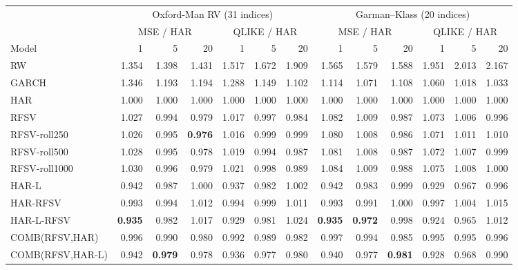 \begin{tabular}{lrrrrrr@{\hskip 14pt}rrrrrr}
\toprule
 & \multicolumn{6}{c}{Oxford-Man RV (31 indices)} & \multicolumn{6}{c}{Garman--Klass (20 indices)}\\
 & \multicolumn{3}{c}{MSE / HAR} & \multicolumn{3}{c}{QLIKE / HAR} & \multicolumn{3}{c}{MSE / HAR} & \multicolumn{3}{c}{QLIKE / HAR}\\
Model & 1 & 5 & 20 & 1 & 5 & 20 & 1 & 5 & 20 & 1 & 5 & 20\\
\midrule
RW & 1.354 & 1.398 & 1.431 & 1.517 & 1.672 & 1.909 & 1.565 & 1.579 & 1.588 & 1.951 & 2.013 & 2.167\\
GARCH & 1.346 & 1.193 & 1.194 & 1.288 & 1.149 & 1.102 & 1.114 & 1.071 & 1.108 & 1.060 & 1.018 & 1.033\\
HAR & 1.000 & 1.000 & 1.000 & 1.000 & 1.000 & 1.000 & 1.000 & 1.000 & 1.000 & 1.000 & 1.000 & 1.000\\
RFSV & 1.027 & 0.994 & 0.979 & 1.017 & 0.997 & 0.984 & 1.082 & 1.009 & 0.987 & 1.073 & 1.006 & 0.996\\
\midrule
RFSV-roll250 & 1.026 & 0.995 & \textbf{0.976} & 1.016 & 0.999 & 0.999 & 1.080 & 1.008 & 0.986 & 1.071 & 1.011 & 1.010\\
RFSV-roll500 & 1.028 & 0.995 & 0.978 & 1.019 & 0.994 & 0.987 & 1.081 & 1.008 & 0.987 & 1.072 & 1.007 & 0.999\\
RFSV-roll1000 & 1.030 & 0.996 & 0.979 & 1.021 & 0.998 & 0.989 & 1.084 & 1.009 & 0.988 & 1.075 & 1.008 & 1.000\\
\midrule
HAR-L & 0.942 & 0.987 & 1.000 & 0.937 & 0.982 & 1.002 & 0.942 & 0.983 & 0.999 & 0.929 & 0.967 & 0.996\\
HAR-RFSV & 0.993 & 0.994 & 1.012 & 0.994 & 0.999 & 1.011 & 0.993 & 0.991 & 1.000 & 0.997 & 1.004 & 1.015\\
HAR-L-RFSV & \textbf{0.935} & 0.982 & 1.017 & 0.929 & 0.981 & 1.024 & \textbf{0.935} & \textbf{0.972} & 0.998 & 0.924 & 0.965 & 1.012\\
\midrule
COMB(RFSV,HAR) & 0.996 & 0.990 & 0.980 & 0.992 & 0.989 & 0.982 & 0.997 & 0.994 & 0.985 & 0.995 & 0.995 & 0.996\\
COMB(RFSV,HAR-L) & 0.942 & \textbf{0.979} & 0.978 & 0.936 & 0.977 & 0.980 & 0.940 & 0.977 & \textbf{0.981} & 0.928 & 0.968 & 0.990\\
\bottomrule
\end{tabular}